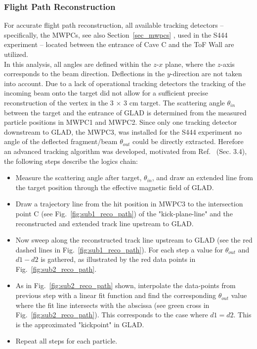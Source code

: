 \subsubsection{Flight Path Reconstruction}\label{subsec:flightpath_reco}
For accurate flight path reconstruction, all available tracking detectors -- specifically, the MWPCs, see also Section~\ref{sec_mwpcs} , used in the S444 experiment -- located between the entrance of Cave C and the ToF Wall are utilized.\\
In this analysis, all angles are defined within the $z$-$x$ plane, where the $z$-axis corresponds to the beam direction. Deflections in the $y$-direction are not taken into account. Due to a lack of operational tracking detectors the tracking of the incoming beam onto the target did not allow for a sufficient precise reconstruction of the vertex in the 3 $\times$ 3 cm target. The scattering angle $\theta_{in}$ between the target and the entrance of GLAD is determined from the measured particle positions in MWPC1 and MWPC2. Since only one tracking detector downstream to GLAD, the MWPC3, was installed for the S444 experiment no angle of the deflected fragment/beam $\theta_{out}$ could be directly extracted. Herefore an advanced tracking algorithm was developed, motivated from Ref.~\cite{bertini2013study} (Sec. 3.4), the following steps describe the logics chain: 
\begin{itemize}
\item Measure the scattering angle after target, $\theta_{in}$, and draw an extended line from the target position through the effective magnetic field of GLAD.  
\item Draw a trajectory line from the hit position in MWPC3 to the intersection point C (see Fig.~\ref{fig:sub1_reco_path}) of the "kick-plane-line" and the reconstructed and extended track line upstream to GLAD.
\item Now sweep along the reconstructed track line upstream to GLAD (see the red dashed lines in Fig.~\ref{fig:sub1_reco_path}). For each step a value for $\theta_{out}$ and $d1-d2$ is gathered, as illustrated by the red data points in Fig.~\ref{fig:sub2_reco_path}.
\item As in Fig.~\ref{fig:sub2_reco_path} shown, interpolate the data-points from previous step with a linear fit function and find the corresponding $\theta_{out}$ value where the fit line intersects with the abscissa (see green cross in Fig.~\ref{fig:sub2_reco_path}). This corresponds to the case where $d1 = d2$. This is the approximated "kickpoint" in GLAD. 
\item Repeat all steps for each particle.
\end{itemize}
